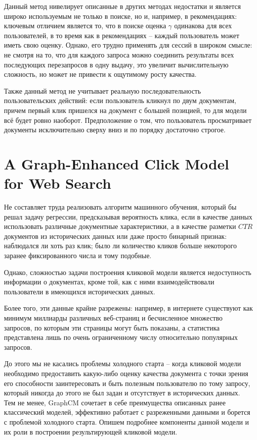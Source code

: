 \documentclass[diploma]{nanolab2015}
\begin{document}
Данный метод нивелирует описанные в других методах недостатки и является широко используемым не только в поиске, но и, например, в рекомендациях: ключевым отличием является то, что в поиске оценка $\gamma$ одинакова для всех пользователей, в то время как в рекомендациях -- каждый пользователь может иметь свою оценку. Однако, его трудно применять для сессий в широком смысле: не смотря на то, что для каждого запроса можно соединить результаты всех последующих перезапросов в одну выдачу, это увеличит вычислительную сложность, но может не привести к ощутимому росту качества.

Также данный метод не учитывает реальную последовательность пользовательских действий: если пользователь кликнул по двум документам, причем первый клик пришелся на документ с большей позицией, то для модели всё будет ровно наоборот. Предположение о том, что пользователь просматривает документы исключительно сверху вниз и по порядку достаточно строгое.

\section{A Graph-Enhanced Click Model for Web Search}
Не составляет труда реализовать алгоритм машинного обучения, который бы решал задачу регрессии, предсказывая вероятность клика, если в качестве данных использовать различные документные характеристики, а в качестве разметки $CTR$ документов из исторических данных или даже просто бинарный признак: наблюдался ли хоть раз клик; было ли количество кликов больше некоторого заранее фиксированного числа и тому подобные.

Однако, сложностью задачи построения кликовой модели является недоступность информации о документах, кроме той, как с ними взаимодействовали пользователи в имеющихся исторических данных.

Более того, эти данные крайне разрежены: например, в интернете существуют как минимум миллиарды различных веб-страниц и бесчисленное множество запросов, по которым эти страницы могут быть показаны, а статистика представлена лишь по очень ограниченному числу относительно популярных запросов.

До этого мы не касались проблемы холодного старта -- когда кликовой модели необходимо предоставить какую-либо оценку качества документа с точки зрения его способности заинтересовать и быть полезным пользователю по тому запросу, который никогда до этого не был задан и отсутствует в исторических данных. Тем не менее, GraphCM \cite{GraphCM} сочетает в себе преимущества описанных ранее классический моделей, эффективно работает с разреженными данными и борется с проблемой холодного старта. Опишем подробнее компоненты данной модели и их роли в построении результирующей кликовой модели.
\end{document}
